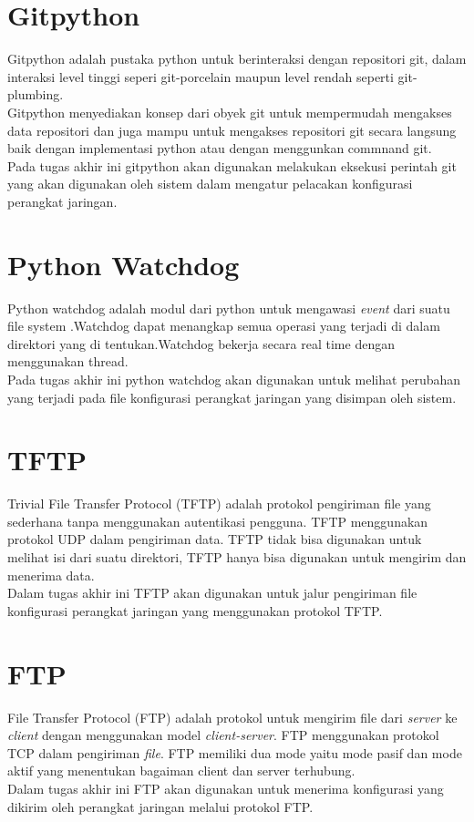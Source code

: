        	\section{Gitpython}
            Gitpython adalah pustaka python untuk berinteraksi dengan repositori git, dalam interaksi level tinggi seperi git-porcelain maupun level rendah seperti git-plumbing.\\ 
            \indent Gitpython menyediakan konsep dari obyek git untuk mempermudah mengakses data repositori dan juga mampu untuk mengakses repositori git secara langsung baik dengan implementasi python atau dengan menggunkan commnand git.\cite{about_gitpython} \\
            \indent Pada tugas akhir ini gitpython akan digunakan melakukan eksekusi perintah git yang akan digunakan oleh sistem dalam mengatur pelacakan konfigurasi perangkat jaringan.\\
            
        \section{Python Watchdog}
            Python watchdog adalah modul dari python untuk mengawasi \textit{event} dari suatu file system .Watchdog dapat menangkap semua operasi yang terjadi di dalam direktori yang di tentukan.Watchdog bekerja secara real time dengan menggunakan thread.\cite{watchdog_python} \\     
            \indent Pada tugas akhir ini python watchdog akan digunakan untuk melihat perubahan yang terjadi pada file konfigurasi perangkat jaringan yang disimpan oleh sistem.\\
        
        \section{TFTP}
        	Trivial File Transfer Protocol (TFTP) adalah protokol pengiriman file yang sederhana tanpa menggunakan autentikasi pengguna. TFTP menggunakan protokol UDP dalam pengiriman data. TFTP tidak bisa digunakan untuk melihat isi dari suatu direktori, TFTP hanya bisa digunakan untuk mengirim dan menerima data.\cite{tftp}\\
        	\indent Dalam tugas akhir ini TFTP akan digunakan untuk jalur pengiriman file konfigurasi perangkat jaringan yang menggunakan protokol TFTP.
        	
        \section{FTP}
        	File Transfer Protocol (FTP) adalah protokol untuk mengirim file dari \textit{server} ke \textit{client} dengan menggunakan model \textit{client-server}. FTP menggunakan protokol TCP dalam pengiriman \textit{file}. FTP memiliki dua mode yaitu mode pasif dan mode aktif yang menentukan bagaiman client dan server terhubung.\cite{ftp}\\
        	\indent Dalam tugas akhir ini FTP akan digunakan untuk menerima konfigurasi yang dikirim oleh perangkat jaringan melalui protokol FTP.
        	
